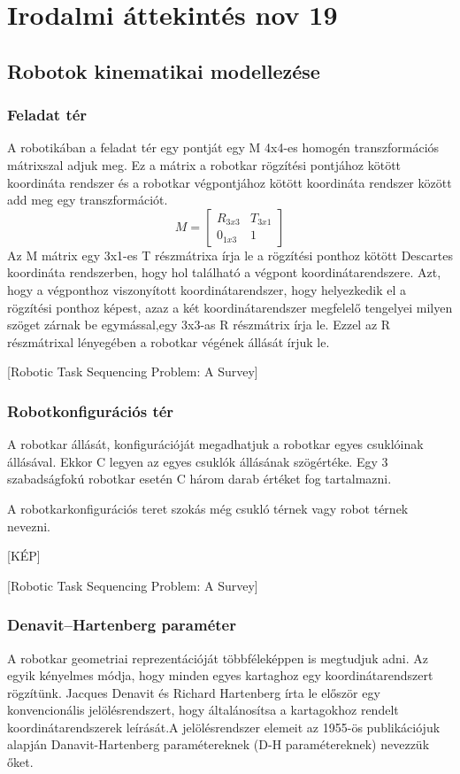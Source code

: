 \chapter{Irodalmi áttekintés nov 19}

\section{Robotok kinematikai modellezése}
\subsection{Feladat tér}
A robotikában a feladat tér egy pontját egy M  4x4-es homogén transzformációs mátrixszal adjuk meg. Ez a mátrix a robotkar rögzítési pontjához kötött koordináta rendszer és a robotkar végpontjához kötött koordináta rendszer között add meg egy transzformációt.
$$ M = 
\begin{bmatrix}
  R_{3x3} & T_{3x1}\\
  0_{1x3} & 1
\end{bmatrix}$$
Az M mátrix egy 3x1-es T részmátrixa írja le a rögzítési ponthoz kötött Descartes koordináta rendszerben, hogy hol található a végpont koordinátarendszere. Azt, hogy a végponthoz viszonyított koordinátarendszer, hogy helyezkedik el a rögzítési ponthoz képest, azaz a két koordinátarendszer megfelelő tengelyei milyen szöget zárnak be egymással,egy 3x3-as R részmátrix írja le. Ezzel az R részmátrixal lényegében a robotkar végének állását írjuk le. 

[Robotic Task Sequencing Problem: A Survey]
\subsection{Robotkonfigurációs tér}

A robotkar állását, konfigurációját megadhatjuk a robotkar egyes csuklóinak állásával. Ekkor C legyen az egyes csuklók állásának szögértéke. Egy 3 szabadságfokú robotkar esetén C három darab értéket fog tartalmazni.

A robotkarkonfigurációs teret szokás még csukló térnek vagy robot térnek nevezni.

[KÉP]

[Robotic Task Sequencing Problem: A Survey]
\subsection{Denavit–Hartenberg paraméter}

A robotkar geometriai reprezentációját többféleképpen is megtudjuk adni.
Az egyik kényelmes módja, hogy minden egyes kartaghoz egy koordinátarendszert rögzítünk. 
Jacques Denavit és Richard Hartenberg írta le először egy konvencionális jelölésrendszert, hogy általánosítsa a kartagokhoz rendelt koordinátarendszerek leírását.A jelölésrendszer elemeit az 1955-ös publikációjuk alapján Danavit-Hartenberg paramétereknek (D-H paramétereknek) nevezzük őket.

